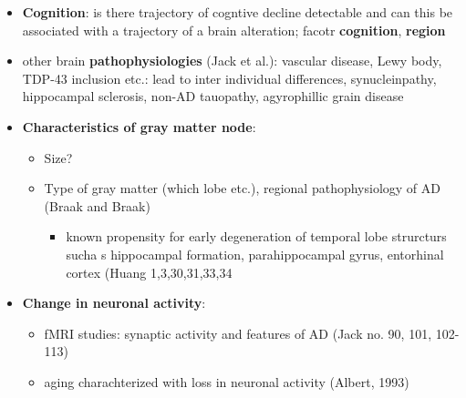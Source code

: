 \documentclass[fleqn]{article}\usepackage{caption}
\begin{document}
\begin{itemize}
\item \textbf{Cognition}: is there trajectory of cogntive decline detectable and can this be associated with a trajectory of a brain alteration; facotr \textbf{cognition}, \textbf{region}

\item other brain \textbf{pathophysiologies} (Jack et al.): vascular disease, Lewy body, TDP-43 inclusion etc.: lead to inter individual differences, synucleinpathy, hippocampal sclerosis, non-AD tauopathy, agyrophillic grain disease

\item \textbf{Characteristics of gray matter node}:
\begin{itemize}
\item Size?
\item Type of gray matter (which lobe etc.), regional pathophysiology of AD (Braak and Braak)
\begin{itemize}
\item known propensity for early degeneration of temporal lobe strurcturs sucha s hippocampal formation, parahippocampal gyrus, entorhinal cortex (Huang 1,3,30,31,33,34
\end{itemize}
\end{itemize}

\item \textbf{Change in neuronal activity}:
\begin{itemize}
\item fMRI studies: synaptic activity and features of AD (Jack no. 90, 101, 102-113)
\item aging charachterized with loss in neuronal activity (Albert, 1993)
\end{itemize}


\end{itemize}
\end{document}

